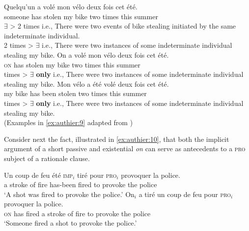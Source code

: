 \documentclass[output=paper,colorlinks,citecolor=brown]{langscibook}
\begin{document}
\begin{exe} 
\settowidth{}
    \ex \label{ex:authier:9}
    \begin{xlist} %
        \ex \label{ex:authier:9a}
            \gll    Quelqu’un a    volé    mon vélo deux fois   cet  été.\\   %
                    someone    has stolen my   bike two  times this summer\\ 
            \glt $\exists$ > 2 times i.e., There were two events of bike stealing initiated by the 						   same indeterminate individual. \\
                    2 times > $\exists$ i.e., There were two instances of some indeterminate 						              individual stealing my bike.%
        \ex \label{ex:authier:9b}
        \gll On a    volé   mon vélo deux fois   cet   été.\\
         \textsc{on} has stolen my  bike two   times this summer \\
         times > $\exists$ \textbf{only} i.e., There were two instances of some indeterminate individual stealing my bike.
       \ex \label{ex:authier:9c}
            \gll    Mon vélo a    été    volé   deux fois   cet  été. \\
            my   bike has been stolen two  times this summer \\
             times > $\exists$ \textbf{only} i.e., There were two instances of some indeterminate individual stealing my bike. \\
            (Examples in \ref{ex:authier:9} adapted from \citealt[8]{creissels2011a})	
    \end{xlist}
\end{exe}

Consider next the fact, illustrated in \ref{ex:authier:10}, that both the implicit argument of a short passive and existential \textit{on} can serve as antecedents to a \textsc{pro} subject of a rationale clause.

\begin{exe} 
    \ex\label{ex:authier:10} 
    \begin{xlist}
        \ex\label{ex:authier:10a}
            \gll    Un coup de feu été \textsc{imp}$_{i}$ tiré pour \textsc{pro}$_{i}$ provoquer la   police. \\   %
            a stroke of fire has-been {} fired to {} provoke the police \\    %
            \glt    `A shot was fired to provoke the police.' %
        \ex\label{ex:authier:10b}
            \gll    On$_{i}$ a tiré un coup de feu pour \textsc{pro}$_{i}$ provoquer la police. \\
                    \textsc{on} has fired a stroke of fire to provoke the police \\
            \glt    `Someone fired a shot to {} provoke the police.'
    \end{xlist}
\end{exe}
\end{document}
